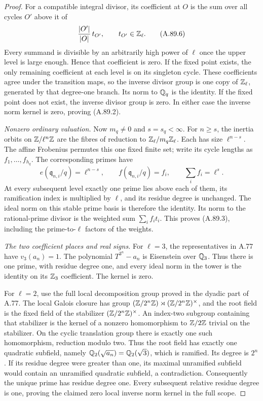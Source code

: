 \begin{proof}
For a compatible integral divisor, its coefficient at $O$
is the sum over all cycles $O'$ above it of
\[
             \frac{|O'|}{|O|}\,t_{O'},\qquad t_{O'}\in\mathbb Z_\ell.
 \tag{A.89.6}
\]
Every summand is divisible by an arbitrarily high power of
$\ell$ once the upper level is large enough.  Hence that
coefficient is zero.  If the fixed point exists, the only
remaining coefficient at each level is on its singleton
cycle.  These coefficients agree under the transition maps,
so the inverse divisor group is one copy of $\mathbb Z_\ell$,
generated by that degree-one branch.  Its norm to $\mathbb Q_q$
is the identity.  If the fixed point does not exist, the
inverse divisor group is zero.  In either case the inverse
norm kernel is zero, proving (A.89.2).

\emph{Nonzero ordinary valuation.}
Now $m_q\ne0$ and $s=s_q<\infty$.
For $n\ge s$, the inertia orbits on $\mathbb Z/\ell^n\mathbb Z$ are
the fibres of reduction to $\mathbb Z_\ell/m_q\mathbb Z_\ell$.
Each has size $\ell^{n-s}$.
The affine Frobenius permutes this one fixed finite set;
write its cycle lengths as $f_1,\ldots,f_{h_q}$.
The corresponding primes have
\[
             e(\mathfrak q_{n,i}/q)=\ell^{n-s},\qquad
             f(\mathfrak q_{n,i}/q)=f_i,\qquad
                         \sum_i f_i=\ell^s.
 \tag{A.89.7}
\]
At every subsequent level exactly one prime lies above
each of them, its ramification index is multiplied by
$\ell$, and its residue degree is unchanged.
The ideal norm on this stable prime basis is therefore
the identity.  Its norm to the rational-prime divisor is
the weighted sum $\sum_i f_i t_i$.  This proves (A.89.3),
including the prime-to-$\ell$ factors of the weights.

\emph{The two coefficient places and real signs.}
For $\ell=3$, the representatives in A.77 have
$v_3(a_n)=1$.  The polynomial $T^{3^n}-a_n$ is Eisenstein
over $\mathbb Q_3$.  Thus there is one prime, with residue degree
one, and every ideal norm in the tower is the identity on
its $\mathbb Z_3$ coefficient.  The kernel is zero.

For $\ell=2$, use the full local decomposition group proved
in the dyadic part of A.77.  The local Galois closure has
group $(\mathbb Z/2^n\mathbb Z)\rtimes(\mathbb Z/2^n\mathbb Z)^\times$, and the root
field is the fixed field of the stabilizer
$(\mathbb Z/2^n\mathbb Z)^\times$.
An index-two subgroup containing that stabilizer is the
kernel of a nonzero homomorphism to $\mathbb Z/2\mathbb Z$ trivial on
the stabilizer.  On the cyclic translation group there is
exactly one such homomorphism, reduction modulo two.
Thus the root field has exactly one quadratic subfield,
namely $\mathbb Q_2(\sqrt{a_n})=\mathbb Q_2(\sqrt3)$, which is ramified.
Its degree is $2^n$.  If its residue degree were greater
than one, its maximal unramified subfield would contain
an unramified quadratic subfield, a contradiction.
Consequently the unique prime has residue degree one.
Every subsequent relative residue degree is one, proving
the claimed zero local inverse norm kernel in the full scope.


\end{proof}
